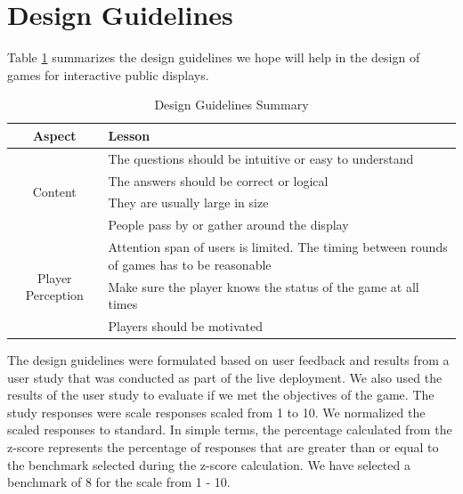 \documentclass{sig-alternate}
\begin{document}
\section{Design Guidelines}
Table \ref{table:design_guidlines_summary} summarizes the design guidelines we hope will help in the design of games for interactive public displays.

\begin{table}[c]
	\caption{Design Guidelines Summary}
	\label{table:design_guidlines_summary}
	\begin{tabular*}{1\textwidth}{c | l}
 		\hline
		Aspect & Lesson\\ \hline
  		\multirow{4}{*}{Content} & The questions should be intuitive or easy to understand\\
 			& The answers should be correct or logical\\
 			& They are usually large in size\\
 			& People pass by or gather around the display\\ \hline
		\multirow{4}{*}{Player Perception} & Attention span of users is limited. The timing between rounds of games has to be reasonable
\\
 			& Make sure the player knows the status of the game at all times\\
 			& Players should be motivated\\ \hline	
	\end{tabular*}
\end{table}

The design guidelines were formulated based on user feedback and results from a user study that was conducted as part of the live deployment. We also used the results of the user study to evaluate if we met the objectives of the game. The study responses were scale responses scaled from 1 to 10. We normalized the scaled responses to standard\cite{wp:standard_score_wiki}. In simple terms, the percentage calculated from the z-score represents the percentage of responses that are greater than or equal to the benchmark selected during the z-score calculation. We have selected a benchmark of 8 for the scale from 1 - 10. 
\end{document}
